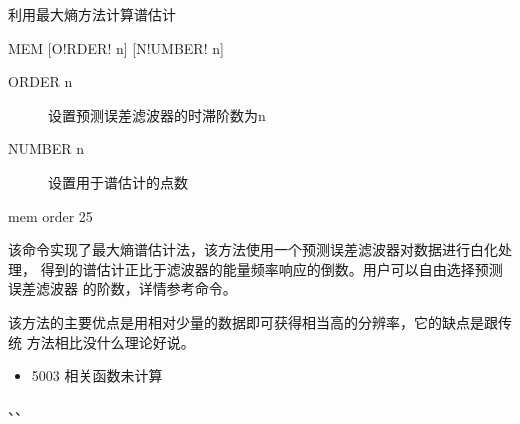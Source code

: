 \label{spe:mem}

利用最大熵方法计算谱估计

\begin{SACSTX}
MEM [O!RDER! n] [N!UMBER! n]
\end{SACSTX}

\begin{description}
\item [ORDER n] 设置预测误差滤波器的时滞阶数为n
\item [NUMBER n] 设置用于谱估计的点数
\end{description}

\begin{SACDFT}
mem order 25
\end{SACDFT}

该命令实现了最大熵谱估计法，该方法使用一个预测误差滤波器对数据进行白化处理，
得到的谱估计正比于滤波器的能量频率响应的倒数。用户可以自由选择预测误差滤波器
的阶数，详情参考命令。

该方法的主要优点是用相对少量的数据即可获得相当高的分辨率，它的缺点是跟传统
方法相比没什么理论好说。

\begin{itemize}
\item 5003 相关函数未计算
\end{itemize}

、、
